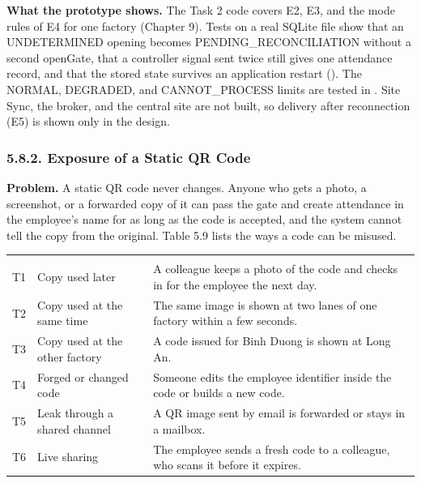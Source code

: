 \textbf{What the prototype shows.} The Task 2 code covers E2, E3, and the mode rules of E4 for one factory (Chapter 9). Tests on a real SQLite file show that an UNDETERMINED opening becomes PENDING\_RECONCILIATION without a second openGate, that a controller signal sent twice still gives one attendance record, and that the stored state survives an application restart (). The NORMAL, DEGRADED, and CANNOT\_PROCESS limits are tested in . Site Sync, the broker, and the central site are not built, so delivery after reconnection (E5) is shown only in the design.

\subsubsection*{5.8.2. Exposure of a Static QR Code}

{}

\textbf{Problem.} A static QR code never changes. Anyone who gets a photo, a screenshot, or a forwarded copy of it can pass the gate and create attendance in the employee's name for as long as the code is accepted, and the system cannot tell the copy from the original. Table 5.9 lists the ways a code can be misused.

\begin{longtable}{|>{\raggedright\arraybackslash}p{40pt}|>{\raggedright\arraybackslash}p{120pt}|>{\raggedright\arraybackslash}p{251pt}|}
\hline
\multicolumn{1}{|>{\columncolor{tableheader}\centering\arraybackslash}p{40pt}|}{\textbf{ID}} & \multicolumn{1}{>{\columncolor{tableheader}\centering\arraybackslash}p{120pt}|}{\textbf{Threat}} & \multicolumn{1}{>{\columncolor{tableheader}\centering\arraybackslash}p{251pt}|}{\textbf{Example}} \\
\hline
\endhead
\multicolumn{3}{c}{\rule{0pt}{20pt}\normalsize\phantomsection\addcontentsline{lot}{table}{\protect\numberline{5.9}Threats from an Exposed QR Code}\textbf{Table 5.9. Threats from an Exposed QR Code}} \\
\endlastfoot
T1 & Copy used later & A colleague keeps a photo of the code and checks in for the employee the next day. \\
\hline
T2 & Copy used at the same time & The same image is shown at two lanes of one factory within a few seconds. \\
\hline
T3 & Copy used at the other factory & A code issued for Binh Duong is shown at Long An. \\
\hline
T4 & Forged or changed code & Someone edits the employee identifier inside the code or builds a new code. \\
\hline
T5 & Leak through a shared channel & A QR image sent by email is forwarded or stays in a mailbox. \\*
\hline\noalign{\nobreak}
T6 & Live sharing & The employee sends a fresh code to a colleague, who scans it before it expires. \\
\hline
\end{longtable}

